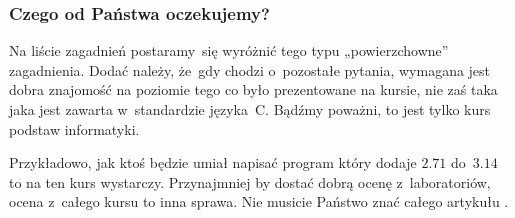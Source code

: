 \documentclass[10pt,t]{beamer}
\begin{document}
\begin{frame}
  \frametitle{Czego od Państwa oczekujemy?}


  Na liście zagadnień postaramy~się wyróżnić tego typu „powierzchowne”
  zagadnienia. Dodać należy, że~gdy chodzi o~pozostałe pytania, wymagana
  jest dobra znajomość na \alert{poziomie tego co było prezentowane na
    kursie}, nie zaś taka jaka jest zawarta w~standardzie języka~C.
  Bądźmy poważni, to jest tylko kurs podstaw informatyki.

  Przykładowo, jak ktoś będzie umiał napisać program który dodaje $2.71$
  do~$3.14$ to na \alert{ten} kurs wystarczy. Przynajmniej by dostać dobrą
  ocenę z~laboratoriów, ocena z~\alert{całego} kursu to inna sprawa.
  Nie musicie Państwo znać całego artykułu
  .


\end{frame}












































\printbibliography





\end{document}
